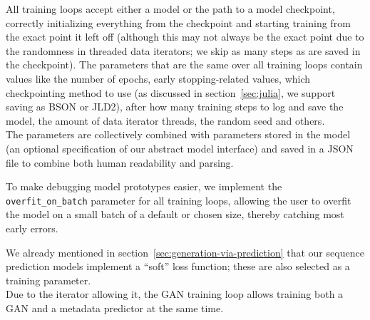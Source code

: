 All training loops accept either a model or the path to a model
checkpoint, correctly initializing everything from the checkpoint and
starting training from the exact point it left off (although this may
not always be the exact point due to the randomness in threaded data
iterators; we skip as many steps as are saved in the checkpoint). The
parameters that are the same over all training loops contain values
like the number of epochs, early stopping-related values, which
checkpointing method to use (as discussed in section~\ref{sec:julia},
we support saving as BSON or JLD2), after how many training steps to
log and save the model, the amount of data iterator threads, the
random seed and others. \\
The parameters are collectively combined with parameters stored in the
model (an optional specification of our abstract model interface) and
saved in a JSON file to combine both human readability and parsing.

To make debugging model prototypes easier, we implement the
\texttt{overfit\_on\_batch} parameter for all training loops, allowing
the user to overfit the model on a small batch of a default or chosen
size, thereby catching most early errors.

We already mentioned in section~\ref{sec:generation-via-prediction}
that our sequence prediction models implement a ``soft'' loss
function; these are also selected as a training parameter. \\
Due to the iterator allowing it, the GAN training loop allows training
both a GAN and a metadata predictor at the same time.


